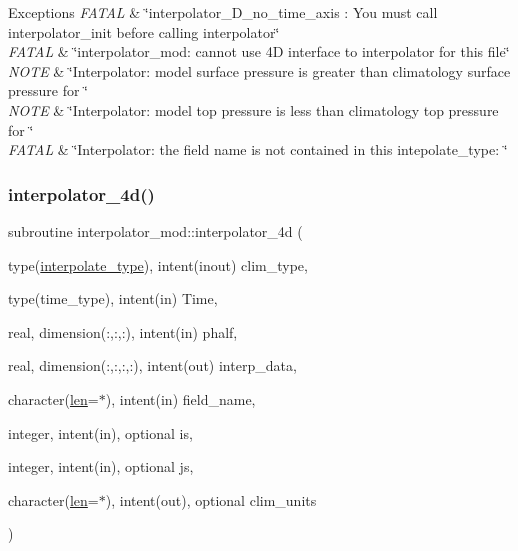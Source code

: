 \begin{DoxyExceptions}{Exceptions}
{\em F\+A\+T\+AL} & \char`\"{}interpolator\+\_\+D\+\_\+no\+\_\+time\+\_\+axis \+: You must call
                interpolator\+\_\+init before calling interpolator\char`\"{} \\
\hline
{\em F\+A\+T\+AL} & \char`\"{}interpolator\+\_\+mod\+: cannot use 4\+D interface to
                interpolator for this file\char`\"{} \\
\hline
{\em N\+O\+TE} & \char`\"{}\+Interpolator\+: model surface pressure is greater than
                climatology surface pressure for \char`\"{} \\
\hline
{\em N\+O\+TE} & \char`\"{}\+Interpolator\+: model top pressure is less than
                climatology top pressure for \char`\"{} \\
\hline
{\em F\+A\+T\+AL} & \char`\"{}\+Interpolator\+: the field name is not contained in this
                intepolate\+\_\+type\+: \char`\"{} \\
\hline
\end{DoxyExceptions}
\mbox{\label{namespaceinterpolator__mod_aa7289f28ea8f0fb09694f8cd62b16cc4}} 
\subsubsection{\texorpdfstring{interpolator\+\_\+4d()}{interpolator\_4d()}}
{\footnotesize\ttfamily subroutine interpolator\+\_\+mod\+::interpolator\+\_\+4d (\begin{DoxyParamCaption}\item[{type(\hyperlink{structinterpolator__mod_1_1interpolate__type}{interpolate\+\_\+type}), intent(inout)}]{clim\+\_\+type,  }\item[{type(time\+\_\+type), intent(in)}]{Time,  }\item[{real, dimension(\+:,\+:,\+:), intent(in)}]{phalf,  }\item[{real, dimension(\+:,\+:,\+:,\+:), intent(out)}]{interp\+\_\+data,  }\item[{character(\hyperlink{namespaceinterpolator__mod_a6bd2ec3395203e1b6aba0610bfbfe16b}{len}=$\ast$), intent(in)}]{field\+\_\+name,  }\item[{integer, intent(in), optional}]{is,  }\item[{integer, intent(in), optional}]{js,  }\item[{character(\hyperlink{namespaceinterpolator__mod_a6bd2ec3395203e1b6aba0610bfbfe16b}{len}=$\ast$), intent(out), optional}]{clim\+\_\+units }\end{DoxyParamCaption})\hspace{0.3cm}{\ttfamily [private]}}



